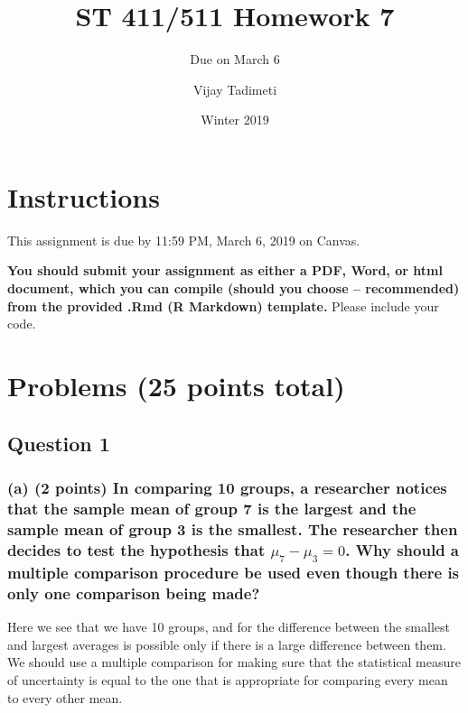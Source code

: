 \documentclass[]{article}
\title{ST 411/511 Homework 7}
\subtitle{Due on March 6}
\author{Vijay Tadimeti}
\date{Winter 2019}
\begin{document}
\maketitle

\section{Instructions}\label{instructions}

This assignment is due by 11:59 PM, March 6, 2019 on Canvas.

\textbf{You should submit your assignment as either a PDF, Word, or html
document, which you can compile (should you choose -- recommended) from
the provided .Rmd (R Markdown) template.} Please include your code.

\section{Problems (25 points total)}\label{problems-25-points-total}

\subsection{Question 1}\label{question-1}

\subsubsection{\texorpdfstring{(a) (2 points) In comparing 10 groups, a
researcher notices that the sample mean of group 7 is the largest and
the sample mean of group 3 is the smallest. The researcher then decides
to test the hypothesis that \(\mu_7-\mu_3=0\). Why should a multiple
comparison procedure be used even though there is only one comparison
being
made?}{(a) (2 points) In comparing 10 groups, a researcher notices that the sample mean of group 7 is the largest and the sample mean of group 3 is the smallest. The researcher then decides to test the hypothesis that \textbackslash{}mu\_7-\textbackslash{}mu\_3=0. Why should a multiple comparison procedure be used even though there is only one comparison being made?}}\label{a-2-points-in-comparing-10-groups-a-researcher-notices-that-the-sample-mean-of-group-7-is-the-largest-and-the-sample-mean-of-group-3-is-the-smallest.-the-researcher-then-decides-to-test-the-hypothesis-that-mu_7-mu_30.-why-should-a-multiple-comparison-procedure-be-used-even-though-there-is-only-one-comparison-being-made}

Here we see that we have 10 groups, and for the difference between the
smallest and largest averages is possible only if there is a large
difference between them. We should use a multiple comparison for making
sure that the statistical measure of uncertainty is equal to the one
that is appropriate for comparing every mean to every other mean.
\end{document}
